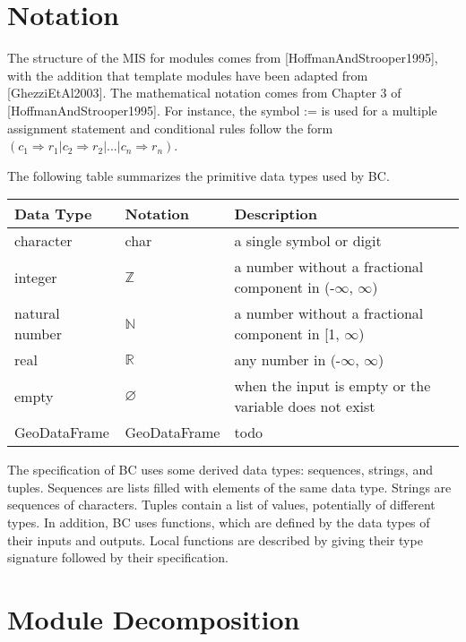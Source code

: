 \documentclass[12pt, titlepage]{article}
\begin{document}
\section{Notation}


The structure of the MIS for modules comes from [HoffmanAndStrooper1995],
with the addition that template modules have been adapted from
[GhezziEtAl2003].  The mathematical notation comes from Chapter 3 of
[HoffmanAndStrooper1995].  For instance, the symbol := is used for a
multiple assignment statement and conditional rules follow the form $(c_1
\Rightarrow r_1 | c_2 \Rightarrow r_2 | ... | c_n \Rightarrow r_n )$.

The following table summarizes the primitive data types used by BC. 
\begin{center}
\renewcommand{\arraystretch}{1.2}
\noindent 
\begin{tabular}{l l p{7.5cm}} 
\toprule 
\textbf{Data Type} & \textbf{Notation} & \textbf{Description}\\ 
\midrule
character & char & a single symbol or digit\\
integer & $\mathbb{Z}$ & a number without a fractional component in (-$\infty$, $\infty$) \\
natural number & $\mathbb{N}$ & a number without a fractional component in [1, $\infty$) \\
real & $\mathbb{R}$ & any number in (-$\infty$, $\infty$)\\
empty & $\varnothing$ & when the input is empty or the variable does not exist \\
GeoDataFrame & GeoDataFrame & todo \\
\bottomrule
\end{tabular} 
\end{center}

\noindent
The specification of BC uses some derived data types: sequences, strings, and
tuples. Sequences are lists filled with elements of the same data type. Strings
are sequences of characters. Tuples contain a list of values, potentially of
different types. In addition, BC uses functions, which
are defined by the data types of their inputs and outputs. Local functions are
described by giving their type signature followed by their specification.

\section{Module Decomposition}
\end{document}
